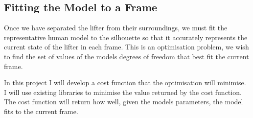 \subsection{Fitting the Model to a Frame}

Once we have separated the lifter from their surroundings, we must fit the representative human model to the silhouette so that it accurately represents the current state of the lifter in each frame. This is an optimisation problem, we wish to find the set of values of the models degrees of freedom that best fit the current frame.

In this project I will develop a cost function that the optimisation will minimise. I will use existing libraries to minimise the value returned by the cost function. The cost function will return how well, given the models parameters, the model fits to the current frame.

